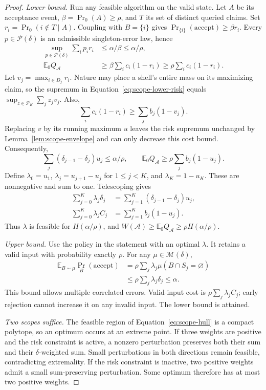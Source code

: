 \documentclass[10pt,letterpaper,twocolumn]{article}
\begin{document}
\begin{proof}
\emph{Lower bound.} Run any feasible algorithm on the valid state. Let $A$ be its acceptance event, $\beta=\Pr_0(A)\geq\rho$, and $T$ its set of distinct queried claims. Set $r_i=\Pr_0(i\notin T\mid A)$. Coupling with $B=\{i\}$ gives $\Pr_{\{i\}}(\mathrm{accept})\geq\beta r_i$. Every $p\in\mathcal P(\delta)$ is an admissible singleton-error law, hence
\begin{align}
 \sup_{p\in\mathcal P(\delta)}\sum_i p_ir_i
 &\leq\alpha/\beta\leq\alpha/\rho,\label{eq:scope-lower-risk}\\
 \mathbb E_0Q_{\mathcal A}
 &\geq\beta\sum_i c_i(1-r_i)
 \geq\rho\sum_i c_i(1-r_i).\label{eq:scope-lower-cost}
\end{align}
Let $v_j=\max_{i\in D_j}r_i$. Nature may place a shell's entire mass on its maximizing claim, so the supremum in Equation~\eqref{eq:scope-lower-risk} equals $\sup_{z\in\mathcal P_K}\sum_jz_jv_j$. Also,
\[
 \sum_i c_i(1-r_i)\geq\sum_jb_j(1-v_j).
\]
Replacing $v$ by its running maximum $u$ leaves the risk supremum unchanged by Lemma~\ref{lem:scope-envelope} and can only decrease this cost bound. Consequently,
\[
 \sum_j(\delta_{j-1}-\delta_j)u_j\leq\alpha/\rho,
 \qquad\mathbb E_0Q_{\mathcal A}\geq\rho\sum_jb_j(1-u_j).
\]
Define $\lambda_0=u_1$, $\lambda_j=u_{j+1}-u_j$ for $1\leq j<K$, and $\lambda_K=1-u_K$. These are nonnegative and sum to one. Telescoping gives
\begin{align*}
 \sum_{j=0}^K\lambda_j\delta_j
 &=\sum_{j=1}^K(\delta_{j-1}-\delta_j)u_j,\\
 \sum_{j=0}^K\lambda_jC_j
 &=\sum_{j=1}^Kb_j(1-u_j).
\end{align*}
Thus $\lambda$ is feasible for $H(\alpha/\rho)$, and $W(\mathcal A)\geq\mathbb E_0Q_{\mathcal A}\geq\rho H(\alpha/\rho)$.

\emph{Upper bound.} Use the policy in the statement with an optimal $\lambda$. It retains a valid input with probability exactly $\rho$. For any $\mu\in\mathcal M(\delta)$,
\begin{align*}
 \mathbb E_{B\sim\mu}\Pr_B(\mathrm{accept})
 &=\rho\sum_j\lambda_j\mu(B\cap S_j=\varnothing)\\
 &\leq\rho\sum_j\lambda_j\delta_j\leq\alpha.
\end{align*}
This bound allows multiple correlated errors. Valid-input cost is $\rho\sum_j\lambda_jC_j$; early rejection cannot increase it on any invalid input. The lower bound is attained.

\emph{Two scopes suffice.} The feasible region of Equation~\eqref{eq:scope-hull} is a compact polytope, so an optimum occurs at an extreme point. If three weights are positive and the risk constraint is active, a nonzero perturbation preserves both their sum and their $\delta$-weighted sum. Small perturbations in both directions remain feasible, contradicting extremality. If the risk constraint is inactive, two positive weights admit a small sum-preserving perturbation. Some optimum therefore has at most two positive weights.
\end{proof}
\end{document}
